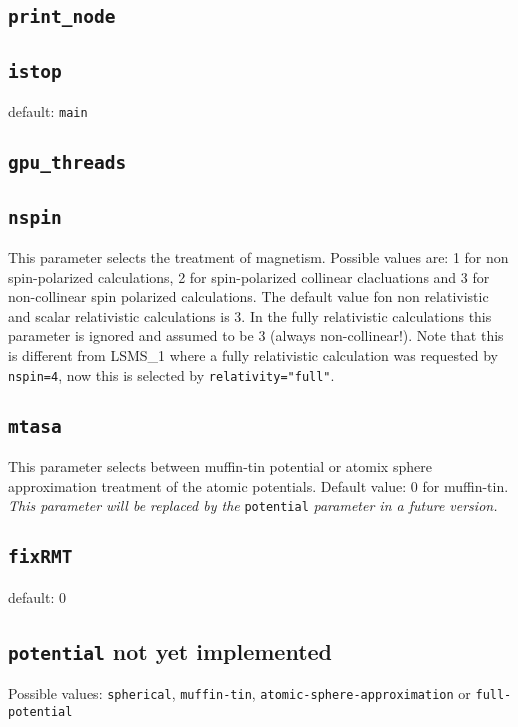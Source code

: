 \subsection{\texttt{print\_node}}

\subsection{\texttt{istop}}
default: \texttt{main}

\subsection{\texttt{gpu\_threads}}

\subsection{\texttt{nspin}}
This parameter selects the treatment of magnetism. Possible values are: 1 for non spin-polarized calculations,
2 for spin-polarized collinear clacluations and 3 for non-collinear spin polarized calculations.
The default value fon non relativistic and scalar relativistic
calculations is 3. In the fully relativistic
calculations this parameter is ignored and assumed to be 3 (always non-collinear!). Note that this is different from LSMS\_1
where a fully relativistic calculation was requested by \texttt{nspin=4}, now this is selected by \texttt{relativity="full"}.

\subsection{\texttt{mtasa}}
This parameter selects between muffin-tin potential or atomix sphere
approximation treatment of the atomic potentials. Default value: 0 for
muffin-tin. \textit{This parameter will be replaced by the}
\texttt{potential} \textit{parameter in a future version.}

\subsection{\texttt{fixRMT}}
default: 0

\subsection{\texttt{potential} not yet implemented}
Possible values: \texttt{spherical}, \texttt{muffin-tin},
\texttt{atomic-sphere-approximation} or \texttt{full-potential}

